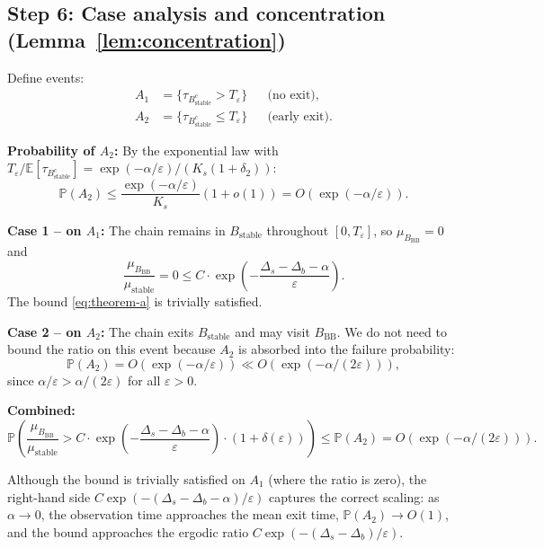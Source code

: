 \documentclass[11pt]{article}
\newcommand{\eps}{\varepsilon}
\newcommand{\Ds}{\Delta_s}
\newcommand{\Db}{\Delta_b}
\newcommand{\Bstable}{B_{\mathrm{stable}}}
\newcommand{\BBB}{B_{\mathrm{BB}}}
\newcommand{\Teps}{T_\eps}
\newcommand{\muBB}{\mu_{\BBB}}
\begin{document}
\subsection*{Step 6: Case analysis and concentration
  (Lemma~\ref{lem:concentration})}

Define events:
\begin{align*}
  A_1 &= \{\tau_{\Bstable^c} > \Teps\}
    && \text{(no exit)}, \\
  A_2 &= \{\tau_{\Bstable^c} \leq \Teps\}
    && \text{(early exit)}.
\end{align*}

\textbf{Probability of $A_2$:}
By the exponential law with
$\Teps / \mathbb{E}[\tau_{\Bstable^c}]
= \exp(-\alpha/\eps)/(K_s(1+\delta_2))$:
\begin{equation}\label{eq:P-A2}
  \mathbb{P}(A_2)
  \leq \frac{\exp(-\alpha/\eps)}{K_s}(1 + o(1))
  = O(\exp(-\alpha/\eps)).
\end{equation}

\textbf{Case 1 -- on $A_1$:}
The chain remains in $\Bstable$ throughout $[0, \Teps]$, so
$\muBB = 0$ and
\[
  \frac{\muBB}{\mu_{\mathrm{stable}}} = 0
  \leq C \cdot \exp\!\left(-\frac{\Ds - \Db - \alpha}{\eps}\right).
\]
The bound \eqref{eq:theorem-a} is trivially satisfied.

\textbf{Case 2 -- on $A_2$:}
The chain exits $\Bstable$ and may visit $\BBB$.  We do not need
to bound the ratio on this event because $A_2$ is absorbed into
the failure probability:
\[
  \mathbb{P}(A_2) = O(\exp(-\alpha/\eps))
  \ll O(\exp(-\alpha/(2\eps))),
\]
since $\alpha/\eps > \alpha/(2\eps)$ for all $\eps > 0$.

\textbf{Combined:}
\begin{equation}\label{eq:prob-bound}
  \mathbb{P}\!\left(
    \frac{\muBB}{\mu_{\mathrm{stable}}}
    > C \cdot \exp\!\left(-\frac{\Ds - \Db - \alpha}{\eps}\right)
    \cdot (1 + \delta(\eps))
  \right)
  \leq \mathbb{P}(A_2)
  = O(\exp(-\alpha/(2\eps))).
\end{equation}

Although the bound is trivially satisfied on $A_1$ (where the ratio
is zero), the right-hand side
$C \exp(-(\Ds - \Db - \alpha)/\eps)$ captures the correct scaling:
as $\alpha \to 0$, the observation time approaches the mean exit
time, $\mathbb{P}(A_2) \to O(1)$, and the bound approaches the
ergodic ratio $C \exp(-(\Ds - \Db)/\eps)$.

\end{document}

